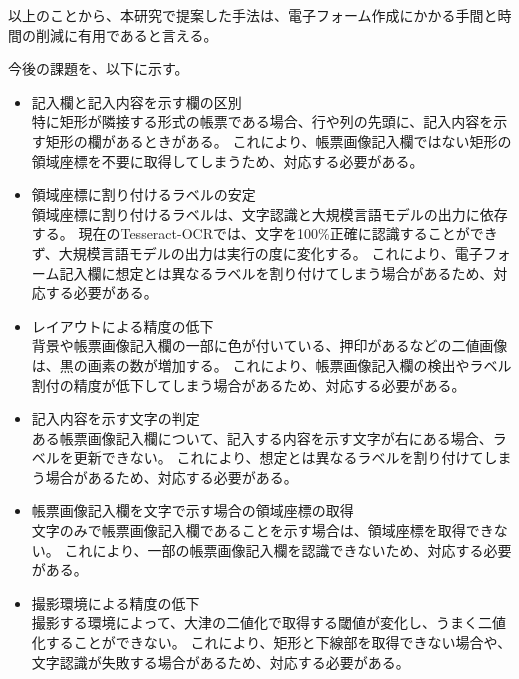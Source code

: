 以上のことから、本研究で提案した手法は、電子フォーム作成にかかる手間と時間の削減に有用であると言える。

今後の課題を、以下に示す。

\begin{itemize}
    \item 記入欄と記入内容を示す欄の区別\\
        特に矩形が隣接する形式の帳票である場合、行や列の先頭に、記入内容を示す矩形の欄があるときがある。
        これにより、帳票画像記入欄ではない矩形の領域座標を不要に取得してしまうため、対応する必要がある。
    \item 領域座標に割り付けるラベルの安定\\
        領域座標に割り付けるラベルは、文字認識と大規模言語モデルの出力に依存する。
        現在のTesseract-OCRでは、文字を100\%正確に認識することができず、大規模言語モデルの出力は実行の度に変化する。
        これにより、電子フォーム記入欄に想定とは異なるラベルを割り付けてしまう場合があるため、対応する必要がある。
    \item レイアウトによる精度の低下\\
        背景や帳票画像記入欄の一部に色が付いている、押印があるなどの二値画像は、黒の画素の数が増加する。
        これにより、帳票画像記入欄の検出やラベル割付の精度が低下してしまう場合があるため、対応する必要がある。
    \item 記入内容を示す文字の判定\\
        ある帳票画像記入欄について、記入する内容を示す文字が右にある場合、ラベルを更新できない。
        これにより、想定とは異なるラベルを割り付けてしまう場合があるため、対応する必要がある。
    \item 帳票画像記入欄を文字で示す場合の領域座標の取得\\
        文字のみで帳票画像記入欄であることを示す場合は、領域座標を取得できない。
        これにより、一部の帳票画像記入欄を認識できないため、対応する必要がある。
    \item 撮影環境による精度の低下\\
        撮影する環境によって、大津の二値化で取得する閾値が変化し、うまく二値化することができない。
        これにより、矩形と下線部を取得できない場合や、文字認識が失敗する場合があるため、対応する必要がある。
\end{itemize}